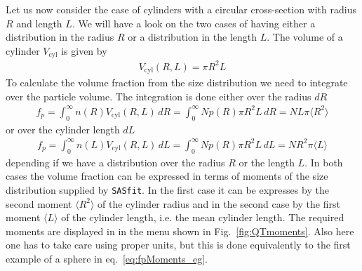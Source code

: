 Let us now consider the case of cylinders with a circular
cross-section with radius $R$ and length $L$. We will have a look on
the two cases of having either a distribution in the radius $R$ or a
distribution in the length $L$. The volume of a cylinder
$V_\textrm{cyl}$ is given by
\begin{align}
V_\textrm{cyl}(R,L) = \pi R^2 L
\end{align}
To calculate the volume fraction from the size distribution we need
to integrate over the particle volume. The integration is done
either over the radius $dR$
\begin{align}
f_p = \int_0^\infty n(R) V_\textrm{cyl}(R,L) \, dR
    = \int_0^\infty N p(R) \pi R^2 L \, dR
    = N L \pi \langle R^2 \rangle
\label{eq:fpMomentsCylR}
\end{align}
or over the cylinder length $dL$
\begin{align}
f_p = \int_0^\infty n(L) V_\textrm{cyl}(R,L) \, dL
    = \int_0^\infty N p(R) \pi R^2 L \, dL
    = N R^2 \pi \langle L \rangle
\label{eq:fpMomentsCylR}
\end{align}
depending if we have a distribution over the radius $R$ or the
length $L$. In both cases the volume fraction can be expressed in
terms of moments of the size distribution supplied by {\tt SASfit}.
In the first case it can be expresses by the second moment $\langle
R^2 \rangle$ of the cylinder radius and in the second case by the
first moment $\langle L \rangle$ of the cylinder length, i.e. the
mean cylinder length. The required moments are displayed in \SASfit
in the menu shown in Fig.\ \ref{fig:QTmoments}. Also here one has to
take care using proper units, but this is done equivalently to the
first example of a sphere in eq.\ \ref{eq:fpMoments_eg}.

